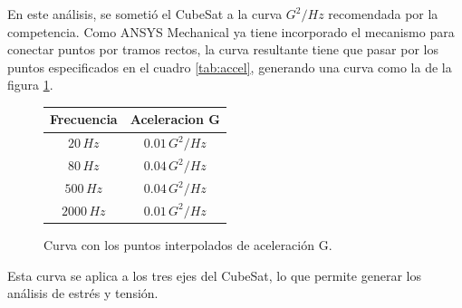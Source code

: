       En este análisis, se sometió el CubeSat a la curva $G^2/Hz$ recomendada por la competencia. Como ANSYS Mechanical
      ya tiene incorporado el mecanismo para conectar puntos por tramos rectos, la curva resultante tiene que pasar por
      los puntos especificados en el cuadro \ref{tab:accel}, generando una curva como la de la figura
      \ref{fig:graph_accel}.

      \begin{figure}[!ht]
        \centering
        \begin{minipage}{0.4\textwidth}
          \centering
          \begin{tabular}{|c|c|}
            \hline
            Frecuencia & Aceleracion G \\ \hline
            $20 \, Hz$ & $0.01 \, G^2/Hz$ \\ \hline
            $80 \, Hz$ & $0.04 \, G^2/Hz$ \\ \hline
            $500 \, Hz$ & $0.04 \, G^2/Hz$ \\ \hline
            $2000 \, Hz$ & $0.01 \, G^2/Hz$ \\ \hline
          \end{tabular}
          \label{tab:accel}
        \end{minipage}
        \hspace{0.05\textwidth}
        \begin{minipage}{0.4\textwidth}
          \caption{Curva con los puntos interpolados de aceleración G.}
          \label{fig:graph_accel}
        \end{minipage}
      \end{figure}

      Esta curva se aplica a los tres ejes del CubeSat, lo que permite generar los análisis de estrés y tensión.

